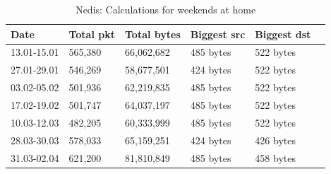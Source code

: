 \begin{table}[H]
    \centering
    \caption{Nedis: Calculations for weekends at home}
    \begin{tabular}{|l|l|l|l|l|l|}
        \hline
        \textbf{Date}    & \textbf{Total pkt} & \textbf{Total bytes} & \textbf{Biggest src} & \textbf{Biggest dst} \\ \hline
        13.01-15.01      & 565,380            & 66,062,682           & 485 bytes            & 522 bytes            \\ \hline
        27.01-29.01      & 546,269            & 58,677,501           & 424 bytes            & 522 bytes            \\ \hline
        03.02-05.02      & 501,936            & 62,219,835           & 485 bytes            &    522 bytes            \\ \hline
        17.02-19.02      & 501,747            & 64,037,197           & 485 bytes            & 522 bytes            \\ \hline
        10.03-12.03      & 482,205            & 60,333,999           & 485 bytes            & 522 bytes            \\ \hline
        28.03-30.03      & 578,033            & 65,159,251           & 424 bytes            & 426 bytes            \\ \hline
        31.03-02.04      & 621,200            & 81,810,849           & 485 bytes            & 458 bytes            \\ \hline
    \end{tabular}
    \label{tab:NedisHomeWeekends}
\end{table}

